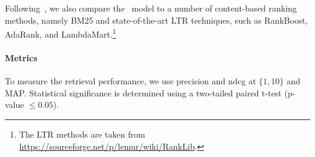 Following~\cite{fan2017learning}, we also compare the \modelname~model to a number of content-based ranking methods,
namely BM25 and state-of-the-art \ac{LTR} techniques, such as RankBoost, AdaRank, and LambdaMart.\footnote{The \ac{LTR} methods are taken from \url{https://sourceforge.net/p/lemur/wiki/RankLib}.}


\paragraph{Metrics}
To measure the retrieval performance, we use precision and ndcg at $\{1,10\}$ and MAP.
Statistical significance is determined using a two-tailed paired t-test (p-value $\leq 0.05$). 

